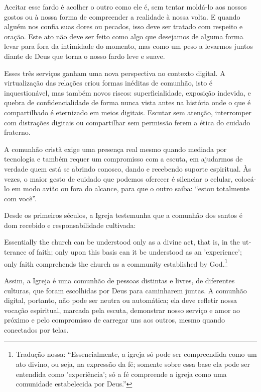 Aceitar esse fardo é acolher o outro como ele é, sem tentar moldá-lo aos nossos gostos ou à nossa forma de compreender a realidade à nossa volta. E quando alguém nos confia suas dores ou pecados, isso deve ser tratado com respeito e oração. Este ato não deve ser feito como algo que desejamos de alguma forma levar para fora da intimidade do momento, mas como um peso a levarmos juntos diante de Deus que torna o nosso fardo leve e suave.

Esses três serviços ganham uma nova perspectiva no contexto digital. A virtualização das relações criou formas inéditas de comunhão, isto é inquestionável, mas também novos riscos: superficialidade, exposição indevida, e quebra de confidencialidade de forma nunca vista antes na história onde o que é compartilhado é eternizado em meios digitais. Escutar sem atenção, interromper com distrações digitais ou compartilhar sem permissão ferem a ética do cuidado fraterno.

A comunhão cristã exige uma presença real mesmo quando mediada por tecnologia e também requer um compromisso com a escuta, em ajudarmos de verdade quem está se abrindo conosco, dando e recebendo suporte espiritual. Às vezes, o maior gesto de cuidado que podemos oferecer é silenciar o celular, colocá-lo em modo avião ou fora do alcance, para que o outro saiba: ``estou totalmente com você''.

Desde os primeiros séculos, a Igreja testemunha que a comunhão dos santos é dom recebido e responsabilidade cultivada:

\begin{citacao}
    \foreignlanguage{english}{Essentially the church can be understood only as a divine act, that is, in the utterance of faith; only upon this basis can it be understood as an 'experience'; only faith comprehends the church as a community established by God.}\footnote{Tradução nossa: ``Essencialmente, a igreja só pode ser compreendida como um ato divino, ou seja, na expressão da fé; somente sobre essa base ela pode ser entendida como 'experiência'; só a fé compreende a igreja como uma comunidade estabelecida por Deus.''} \cite[p.~195]{bonhoeffer1963}
\end{citacao}

Assim, a Igreja é uma comunhão de pessoas distintas e livres, de diferentes culturas, que foram escolhidas por Deus para caminharem juntas. A comunhão digital, portanto, não pode ser neutra ou automática; ela deve refletir nossa vocação espiritual, marcada pela escuta, demonstrar nosso serviço e amor ao próximo e pelo compromisso de carregar uns aos outros, mesmo quando conectados por telas.

